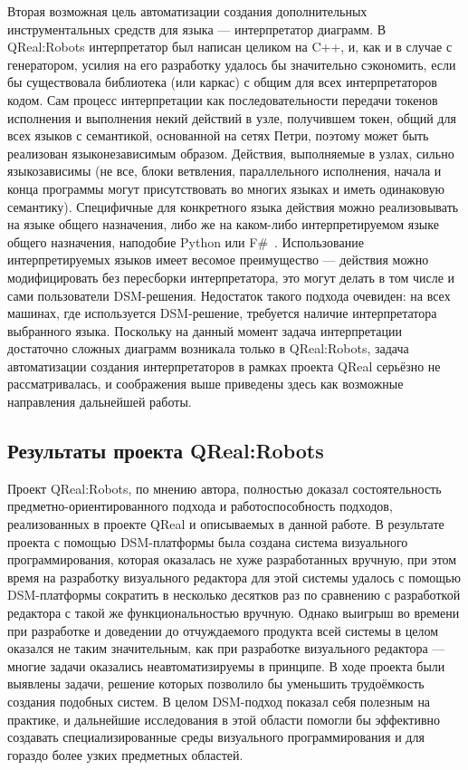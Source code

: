 Вторая возможная цель автоматизации создания дополнительных инструментальных средств 
для языка --- интерпретатор диаграмм. В QReal:Robots интерпретатор был написан целиком 
на C++, и, как и в случае с генератором,  усилия на его разработку удалось бы значительно 
сэкономить, если бы существовала библиотека (или каркас) с общим для всех интерпретаторов 
кодом. Сам процесс интерпретации как последовательности передачи токенов исполнения и 
выполнения некий действий в узле, получившем токен, общий для всех языков с семантикой, 
основанной на сетях Петри, поэтому может быть реализован языконезависимым образом. 
Действия, выполняемые в узлах, сильно языкозависимы (не все, блоки ветвления, параллельного 
исполнения, начала и конца программы могут присутствовать во многих языках и иметь 
одинаковую семантику). Специфичные для конкретного языка действия можно реализовывать 
на языке общего назначения, либо же на каком-либо интерпретируемом языке общего назначения, 
наподобие Python%
или F\#~\cite{syme2012expert}. Использование интерпретируемых языков имеет весомое преимущество --- действия можно 
модифицировать без пересборки интерпретатора, это могут делать в том числе и сами 
пользователи DSM-решения. Недостаток такого подхода очевиден: на всех машинах, где 
используется DSM-решение, требуется наличие интерпретатора выбранного языка. Поскольку 
на данный момент задача интерпретации достаточно сложных диаграмм возникала только 
в QReal:Robots, задача автоматизации создания интерпретаторов в рамках проекта QReal 
серьёзно не рассматривалась, и соображения выше приведены здесь как возможные направления 
дальнейшей работы.

\subsection{Результаты проекта QReal:Robots}
Проект QReal:Robots, по мнению автора, полностью доказал состоятельность предметно-ориентированного 
подхода и работоспособность подходов, реализованных в проекте QReal и описываемых в 
данной работе. В результате проекта с помощью DSM-платформы была создана система визуального 
программирования, которая оказалась не хуже разработанных вручную, при этом время 
на разработку визуального редактора для этой системы удалось с помощью DSM-платформы 
сократить в несколько десятков раз по сравнению с разработкой редактора с такой же 
функциональностью вручную. Однако выигрыш во времени при разработке и доведении до 
отчуждаемого продукта всей системы в целом оказался не таким значительным, как при 
разработке визуального редактора --- многие задачи оказались неавтоматизируемы в принципе. 
В ходе проекта были выявлены задачи, решение которых позволило бы уменьшить трудоёмкость 
создания подобных систем. В целом DSM-подход показал себя полезным на практике, и 
дальнейшие исследования в этой области помогли бы эффективно создавать специализированные 
среды визуального программирования и для гораздо более узких предметных областей.

